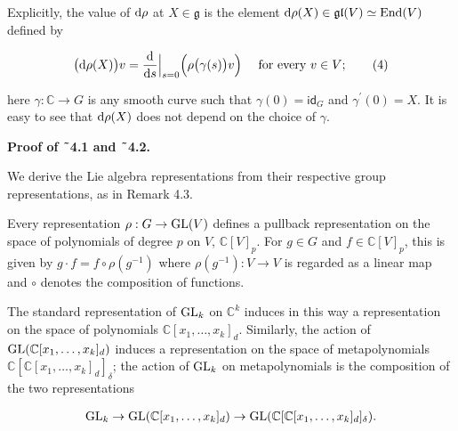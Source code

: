 \documentclass[10pt,a4paper]{article}
\begin{document}
Explicitly, the value of $\textnormal{d}\rho$ at $X\in\mathfrak{g}$ is the element $\textnormal{d}\rho(X)\in\mathfrak{gl}(V)\simeq\textnormal{End}(V)$ defined by



\[\begin{aligned}
\big{(}\textnormal{d}\rho(X)\big{)}v=\frac{\textnormal{d}}{\textnormal{d}s}\Big{|}_{s=0}\Big{(}\rho\big{(}\gamma(s)\big{)}v\Big{)}\quad\text{ for every $v\in V$};\qquad\text{(4)}
\end{aligned}\]


here $\gamma:\mathbb{C}\to G$ is any smooth curve such that $\gamma(0)=\mathsf{id}_{G}$ and $\gamma^{\prime}(0)=X$. It is easy to see that $\textnormal{d}\rho(X)$ does not depend on the choice of $\gamma$.






\par\medskip\noindent\textbf{Proof of ˜4.1 and ˜4.2.}\par




We derive the Lie algebra representations from their respective group representations, as in Remark 4.3.





Every representation $\rho:G\to\textnormal{GL}(V)$ defines a pullback representation on the space of polynomials of degree $p$ on $V$, $\mathbb{C}[V]_{p}$. For $g\in G$ and $f\in\mathbb{C}[V]_{p}$, this is given by $g\cdot f=f\circ\rho(g^{-1})$ where $\rho(g^{-1}):V\to V$ is regarded as a linear map and $\circ$ denotes the composition of functions.





The standard representation of $\textnormal{GL}_{k}$ on $\mathbb{C}^{k}$ induces in this way a representation on the space of polynomials $\mathbb{C}[x_{1},\ldots,x_{k}]_{d}$. Similarly, the action of $\textnormal{GL}(\mathbb{C}[x_{1},\ldots,x_{k}]_{d})$ induces a representation on the space of metapolynomials $\mathbb{C}[\mathbb{C}[x_{1},\ldots,x_{k}]_{d}]_{\delta}$; the action of $\textnormal{GL}_{k}$ on metapolynomials is the composition of the two representations



\[\begin{aligned}
\textnormal{GL}_{k}\to\textnormal{GL}(\mathbb{C}[x_{1},\ldots,x_{k}]_{d})\to\textnormal{GL}(\mathbb{C}[\mathbb{C}[x_{1},\ldots,x_{k}]_{d}]_{\delta}).
\end{aligned}\]
\end{document}
